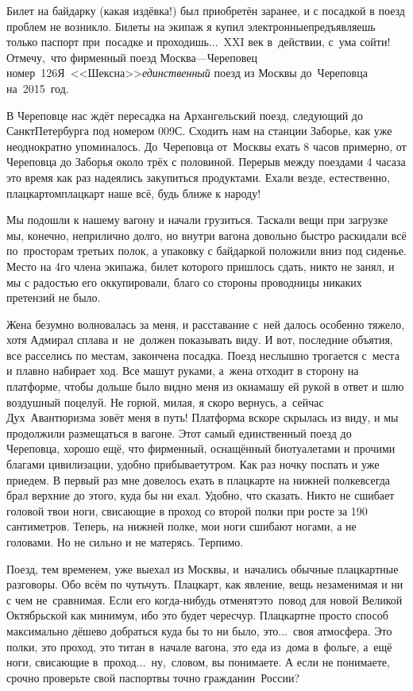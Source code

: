 Билет на байдарку (какая издёвка!) был приобретён заранее, и с посадкой в поезд проблем не возникло. Билеты на экипаж я купил электронные\mdash предъявляешь только паспорт при~посадке и проходишь$\ldots$~XXI век в~действии, с~ума сойти! Отмечу,~что фирменный поезд {Москва\thinspace\nobreakdash---\thinspace Череповец} номер~126Я~<<Шексна>>\mdash \textit{единственный} поезд из Москвы до~Череповца на~2015~год. 
 
В Череповце нас ждёт пересадка на Архангельский поезд, следующий до Санкт\sdash Петербурга под номером 009С. Сходить нам на станции Заборье, как уже неоднократно упоминалось. До~Череповца от~Москвы ехать 8 часов примерно, от Череповца до Заборья около трёх с половиной. Перерыв между поездами 4 часа\mdash за это время как раз надеялись закупиться продуктами. Ехали везде, естественно, плацкартом\mdash плацкарт наше всё, будь ближе к народу! 

Мы подошли к нашему вагону и начали грузиться. Таскали вещи при загрузке мы, конечно, неприлично долго, но внутри вагона довольно быстро раскидали всё по~просторам третьих полок, а упаковку с байдаркой положили вниз под сиденье. Место на 4\sdash го члена экипажа, билет которого пришлось сдать, никто не занял, и мы с радостью его оккупировали, благо со стороны проводницы никаких претензий не было.

Жена безумно волновалась за меня, и расставание с~ней далось особенно тяжело, хотя Адмирал сплава и~не~должен показывать виду. И вот, последние объятия, все расселись по местам, закончена посадка. Поезд неслышно трогается с~места и плавно набирает ход. Все машут руками, а~жена отходит в сторону на платформе, чтобы дольше было видно меня из окна\mdash машу ей рукой в ответ и шлю воздушный поцелуй. Не горюй, милая, я скоро вернусь, а~сейчас Дух~Авантюризма зовёт меня в путь!
\newpage
Платформа вскоре скрылась из виду, и мы продолжили размещаться в вагоне. Этот самый единственный поезд до Череповца, хорошо ещё, что фирменный, оснащённый биотуалетами и прочими благами цивилизации, удобно прибывает\mdash утром. Как раз ночку поспать и уже приедем. В первый раз мне довелось ехать в плацкарте на нижней полке\mdash всегда брал верхние до этого, куда бы ни ехал. Удобно, что сказать. Никто не сшибает головой твои ноги, свисающие в проход со второй полки при росте за 190 сантиметров. Теперь, на нижней полке, мои ноги сшибают ногами, а не головами. Но не сильно и не матерясь. Терпимо. 

Поезд, тем временем, уже выехал из Москвы, и~начались обычные плацкартные разговоры.  Обо всём по чуть\sdash чуть. Плацкарт, как явление, вещь незаменимая и ни с чем не~сравнимая. Если его когда-нибудь отменят\mdash это~повод для новой Великой Октябрьской как минимум, ибо это будет чересчур. Плацкарт\mdash не просто способ максимально дёшево добраться куда бы то ни было, это$\ldots$~своя атмосфера. Это полки, это проход, это титан в~начале вагона, это еда из~дома в~фольге, а~ещё ноги, свисающие в~проход$\ldots$~ну,~словом, вы понимаете. А если не понимаете, срочно проверьте свой паспорт\mdash вы точно гражданин~России? 

